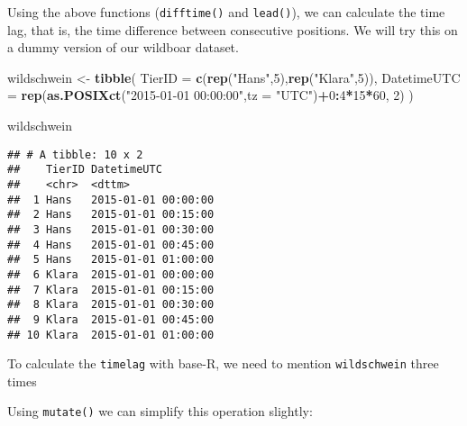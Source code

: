 \documentclass[
]{article}
\newenvironment{Shaded}{\begin{snugshade}}{\end{snugshade}}
\newcommand{\DataTypeTok}[1]{\textcolor[rgb]{0.13,0.29,0.53}{#1}}
\newcommand{\DecValTok}[1]{\textcolor[rgb]{0.00,0.00,0.81}{#1}}
\newcommand{\KeywordTok}[1]{\textcolor[rgb]{0.13,0.29,0.53}{\textbf{#1}}}
\newcommand{\NormalTok}[1]{#1}
\newcommand{\OperatorTok}[1]{\textcolor[rgb]{0.81,0.36,0.00}{\textbf{#1}}}
\newcommand{\StringTok}[1]{\textcolor[rgb]{0.31,0.60,0.02}{#1}}
\begin{document}
Using the above functions (\texttt{difftime()} and \texttt{lead()}), we
can calculate the time lag, that is, the time difference between
consecutive positions. We will try this on a dummy version of our
wildboar dataset.

\begin{Shaded}
\begin{Highlighting}[]
\NormalTok{wildschwein <-}\StringTok{ }\KeywordTok{tibble}\NormalTok{(}
  \DataTypeTok{TierID =} \KeywordTok{c}\NormalTok{(}\KeywordTok{rep}\NormalTok{(}\StringTok{"Hans"}\NormalTok{,}\DecValTok{5}\NormalTok{),}\KeywordTok{rep}\NormalTok{(}\StringTok{"Klara"}\NormalTok{,}\DecValTok{5}\NormalTok{)),}
  \DataTypeTok{DatetimeUTC =} \KeywordTok{rep}\NormalTok{(}\KeywordTok{as.POSIXct}\NormalTok{(}\StringTok{"2015-01-01 00:00:00"}\NormalTok{,}\DataTypeTok{tz =} \StringTok{"UTC"}\NormalTok{)}\OperatorTok{+}\DecValTok{0}\OperatorTok{:}\DecValTok{4}\OperatorTok{*}\DecValTok{15}\OperatorTok{*}\DecValTok{60}\NormalTok{, }\DecValTok{2}\NormalTok{)}
\NormalTok{  )}

\NormalTok{wildschwein}
\end{Highlighting}
\end{Shaded}

\begin{verbatim}
## # A tibble: 10 x 2
##    TierID DatetimeUTC        
##    <chr>  <dttm>             
##  1 Hans   2015-01-01 00:00:00
##  2 Hans   2015-01-01 00:15:00
##  3 Hans   2015-01-01 00:30:00
##  4 Hans   2015-01-01 00:45:00
##  5 Hans   2015-01-01 01:00:00
##  6 Klara  2015-01-01 00:00:00
##  7 Klara  2015-01-01 00:15:00
##  8 Klara  2015-01-01 00:30:00
##  9 Klara  2015-01-01 00:45:00
## 10 Klara  2015-01-01 01:00:00
\end{verbatim}

To calculate the \texttt{timelag} with base-R, we need to mention
\texttt{wildschwein} three times

\begin{Shaded}
\end{Shaded}

Using \texttt{mutate()} we can simplify this operation slightly:
\end{document}
